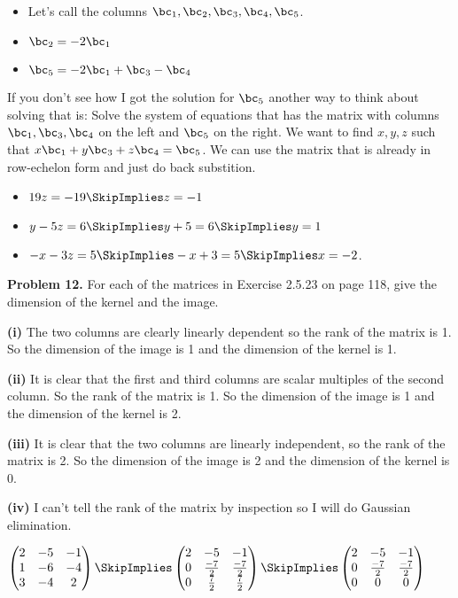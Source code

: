 \documentclass[oneside,12pt]{amsart}
\begin{document}
\begin{itemize}
  \item Let's call the columns $\bc_1,\bc_2,\bc_3,\bc_4,\bc_5$.
  \item $\bc_2 = -2 \bc_1$
  \item  $\bc_5 = -2 \bc_1 + \bc_3 -\bc_4$
\end{itemize}

If you don't see how I got the solution for $\bc_5$
another way to think about solving that is: Solve the system of equations
that has the matrix with columns $\bc_1,\bc_3, \bc_4$ on the left and $\bc_5$ on the right.
We want to find $x,y,z$ such that $x\bc_1+y\bc_3+z\bc_4 = \bc_5$.
We can use the matrix that is already in row-echelon form and just do back substition.

\begin{itemize}
\item $19z = -19 \SkipImplies z = -1$
\item $y - 5z = 6 \SkipImplies y + 5 = 6 \SkipImplies y = 1$
\item $-x -3z = 5 \SkipImplies -x + 3 = 5 \SkipImplies x = -2$.
\end{itemize}

\bigskip

\textbf{Problem 12.} For each of the matrices in Exercise 2.5.23 on page 118,
give the dimension of the kernel and the image.

\bigskip

\textbf{(i)} The two columns are clearly linearly dependent so the rank of
the matrix is 1. So the dimension of the image is 1 and the dimension of
the kernel is 1.

\bigskip

\textbf{(ii)} It is clear that the first and third columns are scalar multiples
of the second column. So the rank of the matrix is 1. So the dimension of
the image is 1 and the dimension of the kernel is 2.

\bigskip


\textbf{(iii)} It is clear that the two columns are linearly independent, so
the rank of the matrix is 2. So the dimension of the image is 2 and the dimension
of the kernel is 0.

\bigskip

\textbf{(iv)} I can't tell the rank of the matrix by inspection so I will do
Gaussian elimination.

\bigskip

$
\begin{pmatrix}
2 & -5 & -1 \\
1 & -6 & -4 \\
3 & -4 & 2
\end{pmatrix}
\SkipImplies
\begin{pmatrix}
2 & -5 & -1 \\
0 & \frac{-7}{2} & \frac{-7}{2} \\
0 & \frac{7}{2} & \frac{7}{2}
\end{pmatrix}
\SkipImplies
\begin{pmatrix}
2 & -5 & -1 \\
0 & \frac{-7}{2} & \frac{-7}{2} \\
0 & 0 & 0
\end{pmatrix}
$
\end{document}
